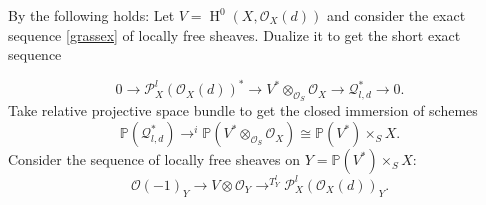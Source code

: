 \documentclass{amsart}
\theoremstyle{plain}
\theoremstyle{definition}
\theoremstyle{remark}
\numberwithin{equation}{theorem}
\begin{document}
By \cite{maa09} the following holds: Let $V={\operatorname{H} }^0(X,{\mathcal{O} }_X(d))$ and 
consider the exact sequence \ref{grassex} of locally free
sheaves. Dualize it to get the short exact sequence

\[ 0 \rightarrow {\mathcal{P} }^l_X({\mathcal{O} }_X(d))^*\rightarrow V^*\otimes_{{\mathcal{O} }_S} {\mathcal{O} }_X
\rightarrow {\mathcal{Q}}_{l,d}^*\rightarrow 0.\]
Take relative projective space bundle to get the closed immersion of
schemes
\[ {\mathbb{P}}({\mathcal{Q}}_{l,d}^*)\rightarrow^i {\mathbb{P}}(V^*\otimes_{{\mathcal{O} }_S} {\mathcal{O} }_X)\cong {\mathbb{P}}(V^*)\times_S X.\]
Consider the sequence of locally free sheaves on $Y={\mathbb{P}}(V^*)\times_S X$:
\[ {\mathcal{O} }(-1)_Y\rightarrow V\otimes {\mathcal{O} }_Y\rightarrow^{T^l_Y}
{\mathcal{P} }^l_X({\mathcal{O} }_X(d))_Y .\]
\end{document}
